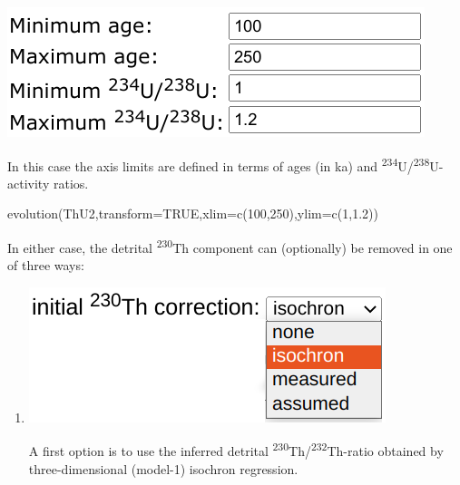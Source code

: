 \begin{refsection}
\begin{enumerate}
  \noindent\begin{minipage}[t]{.4\linewidth}
  \strut\vspace*{-\baselineskip}\newline
  \includegraphics[width=\linewidth]{../figures/ThUvsAgeLimits.png}
  \end{minipage}
  \begin{minipage}[t]{.6\linewidth}
    In this case the axis limits are defined in terms of ages (in ka)
    and \textsuperscript{234}U/\textsuperscript{238}U-activity ratios.
  \end{minipage}

\begin{console}
evolution(ThU2,transform=TRUE,xlim=c(100,250),ylim=c(1,1.2))
\end{console}

  In either case, the detrital \textsuperscript{230}Th component can
  (optionally) be removed in one of three ways:

\begin{enumerate}
  \item \begin{minipage}[t]{.4\linewidth}
    \strut\vspace*{-\baselineskip}\newline
    \includegraphics[width=\linewidth]{../figures/ThUdetritalisochroncorr.png}
  \end{minipage}
    \begin{minipage}[t]{.6\linewidth}
      A first option is to use the inferred detrital
      \textsuperscript{230}Th/\textsuperscript{232}Th-ratio obtained
      by three-dimensional (model-1) isochron regression.
    \end{minipage}


\end{enumerate}
\end{enumerate}
\end{refsection}
